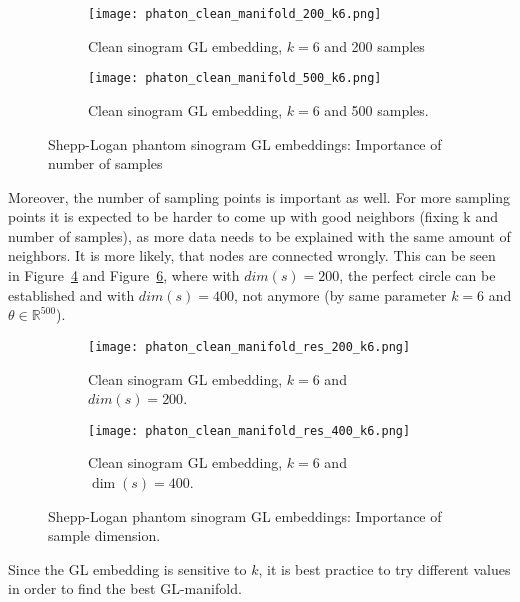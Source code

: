 \begin{figure}[H]
    \captionsetup[subfigure]{justification=centering}
    \centering
    \begin{subfigure}[t]{0.45\textwidth}
        \texttt{[image: phaton\_clean\_manifold\_200\_k6.png]}
        \caption{Clean sinogram GL embedding, $k = 6$ and 200 samples}
        \label{fig:clean_manifold_200}
    \end{subfigure}\hfill
    \begin{subfigure}[t]{0.45\textwidth}
      \texttt{[image: phaton\_clean\_manifold\_500\_k6.png]}
      \caption{Clean sinogram GL embedding, $k = 6$ and 500 samples.}
      \label{fig:clean_manifold_500}
    \end{subfigure}\hfill
    \caption{Shepp-Logan phantom sinogram GL embeddings: Importance of number of samples}
  \end{figure}


Moreover, the number of sampling points is important as well.
For more sampling points it is expected to be harder to come up with good neighbors (fixing k and number of samples),
as more data needs to be explained with the same amount of neighbors. It is more likely, that nodes are connected wrongly.
This can be seen in Figure~\ref{fig:clean_manifold_res200} and Figure~\ref{fig:clean_manifold_res400}, where with $dim(s) = 200$,
the perfect circle can be established and with $dim(s) = 400$, not anymore (by same parameter $k = 6$ and $\theta \in \mathbb{R}^{500}$).

\begin{figure}[H]
    \captionsetup[subfigure]{justification=centering}
    \centering
    \begin{subfigure}[t]{0.4\textwidth}
        \texttt{[image: phaton\_clean\_manifold\_res\_200\_k6.png]}
        \caption{Clean sinogram GL embedding, $k = 6$ and $dim(s)=200$.}
        \label{fig:clean_manifold_res200}
    \end{subfigure}\hfill
    \begin{subfigure}[t]{0.4\textwidth}
      \texttt{[image: phaton\_clean\_manifold\_res\_400\_k6.png]}
      \caption{Clean sinogram GL embedding, $k = 6$ and $\dim(s)=400$.}
      \label{fig:clean_manifold_res400}
    \end{subfigure}\hfill
    \caption{Shepp-Logan phantom sinogram GL embeddings: Importance of sample dimension.}
  \end{figure}

\begin{tcolorbox}[colback=red!5!white,colframe=red!75!black]
    Since the GL embedding is sensitive to $k$, it is best practice to try different values in order to find the best GL-manifold.
\end{tcolorbox}





